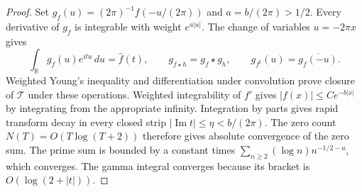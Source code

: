 \begin{proof}
Set $g_f(u)=(2\pi)^{-1}f(-u/(2\pi))$ and $a=b/(2\pi)>1/2$.
Every derivative of $g_f$ is integrable with weight $e^{a|u|}$.
The change of variables $u=-2\pi x$ gives
\[
 \int_{\mathbb R}g_f(u)e^{itu}\,du=\widehat f(t),\qquad
 g_{f\star h}=g_f\star g_h,\qquad
 g_{f^\sharp}(u)=\overline{g_f(-u)}.
\]
Weighted Young's inequality and differentiation under convolution
prove closure of $\mathcal T$ under these operations.
Weighted integrability of $f'$ gives
$|f(x)|\leq C e^{-b|x|}$ by integrating from the appropriate infinity.
Integration by parts gives rapid transform decay in every closed
strip $|\operatorname{Im}t|\leq\eta<b/(2\pi)$.
The zero count $N(T)=O(T\log(T+2))$ therefore gives absolute
convergence of the zero sum.
The prime sum is bounded by a constant times
$\sum_{n\geq2}(\log n)n^{-1/2-a}$, which converges.
The gamma integral converges because its bracket is
$O(\log(2+|t|))$.


\end{proof}
